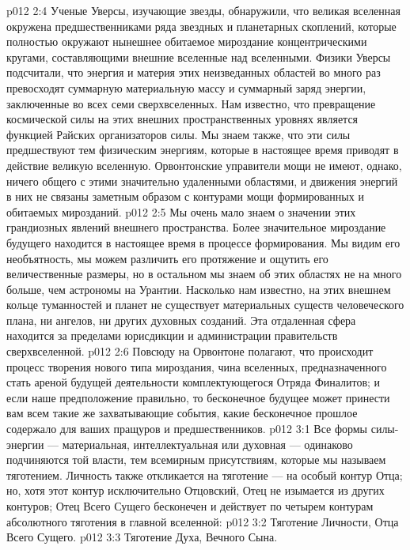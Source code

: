 \vs p012 2:4 \pc Ученые Уверсы, изучающие звезды, обнаружили, что великая вселенная окружена предшественниками ряда звездных и планетарных скоплений, которые полностью окружают нынешнее обитаемое мироздание концентрическими кругами, составляющими внешние вселенные над вселенными. Физики Уверсы подсчитали, что энергия и материя этих неизведанных областей во много раз превосходят суммарную материальную массу и суммарный заряд энергии, заключенные во всех семи сверхвселенных. Нам известно, что превращение космической силы на этих внешних пространственных уровнях является функцией Райских организаторов силы. Мы знаем также, что эти силы предшествуют тем физическим энергиям, которые в настоящее время приводят в действие великую вселенную. Орвонтонские управители мощи не имеют, однако, ничего общего с этими значительно удаленными областями, и движения энергий в них не связаны заметным образом с контурами мощи формированных и обитаемых мирозданий.
\vs p012 2:5 \pc Мы очень мало знаем о значении этих грандиозных явлений внешнего пространства. Более значительное мироздание будущего находится в настоящее время в процессе формирования. Мы видим его необъятность, мы можем различить его протяжение и ощутить его величественные размеры, но в остальном мы знаем об этих областях не на много больше, чем астрономы на Урантии. Насколько нам известно, на этих внешнем кольце туманностей и планет не существует материальных существ человеческого плана, ни ангелов, ни других духовных созданий. Эта отдаленная сфера находится за пределами юрисдикции и администрации правительств сверхвселенной.
\vs p012 2:6 Повсюду на Орвонтоне полагают, что происходит процесс творения нового типа мироздания, чина вселенных, предназначенного стать ареной будущей деятельности комплектующегося Отряда Финалитов; и если наше предположение правильно, то бесконечное будущее может принести вам всем такие же захватывающие события, какие бесконечное прошлое содержало для ваших пращуров и предшественников.
\vs p012 3:1 Все формы силы\hyp{}энергии --- материальная, интеллектуальная или духовная --- одинаково подчиняются той власти, тем всемирным присутствиям, которые мы называем тяготением. Личность также откликается на тяготение --- на особый контур Отца; но, хотя этот контур исключительно Отцовский, Отец не изымается из других контуров; Отец Всего Сущего бесконечен и действует по  четырем контурам абсолютного тяготения в главной вселенной:
\vs p012 3:2 \bibnobreakspace Тяготение Личности, Отца Всего Сущего.
\vs p012 3:3 \bibnobreakspace Тяготение Духа, Вечного Сына.
